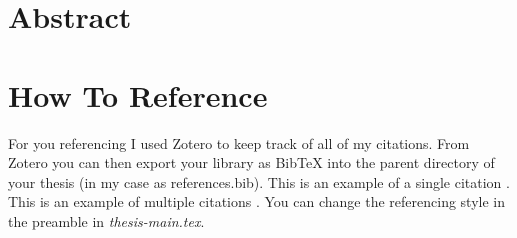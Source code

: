 \section{Abstract}
\lipsum[1]
\section{How To Reference}
For you referencing I used Zotero to keep track of all of my citations. From Zotero you can then export your library as BibTeX into the parent directory of your thesis (in my case as references.bib). This is an example of a single citation \cite{frost_gecko-inspired_2016}. This is an example of multiple citations \cite{frost_gecko-inspired_2016,frost_micro_2016,frost_semitransparent_2018}. You can change the referencing style in the preamble in \textit{thesis-main.tex}.